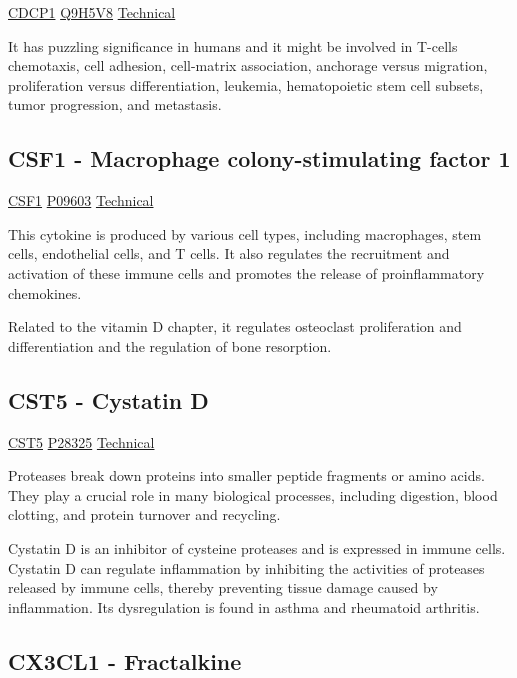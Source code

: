 \href{https://en.wikipedia.org/wiki/CDCP1}{CDCP1}
\href{http://www.uniprot.org/uniprot/Q9H5V8}{Q9H5V8}
\href{https://olink.com/products-services/target/protein/?assayID=5067}{Technical}

It has puzzling significance in humans and it might be involved in T-cells chemotaxis, cell adhesion, cell-matrix association, anchorage versus migration, proliferation versus differentiation, leukemia, hematopoietic stem cell subsets, tumor progression, and metastasis.


\subsection{CSF1 - Macrophage colony-stimulating factor 1}

\href{https://en.wikipedia.org/wiki/Macrophage\_colony-stimulating\_factor}{CSF1}
\href{http://www.uniprot.org/uniprot/P09603}{P09603}
\href{https://olink.com/products-services/target/protein/?assayID=5110}{Technical}

This cytokine is produced by various cell types, including macrophages, stem cells, endothelial cells, and T cells. It also regulates the recruitment and activation of these immune cells and promotes the release of proinflammatory chemokines.

Related to the vitamin D chapter, it regulates osteoclast proliferation and differentiation and the regulation of bone resorption.

\subsection{CST5 - Cystatin D}

\href{https://en.wikipedia.org/wiki/CST5}{CST5}
\href{http://www.uniprot.org/uniprot/P28325}{P28325}
\href{https://olink.com/products-services/target/protein/?assayID=5082}{Technical}

Proteases break down proteins into smaller peptide fragments or amino acids. They play a crucial role in many biological processes, including digestion, blood clotting, and protein turnover and recycling.

Cystatin D is an inhibitor of cysteine proteases and is expressed in immune cells. Cystatin D can regulate inflammation by inhibiting the activities of proteases released by immune cells, thereby preventing tissue damage caused by inflammation. Its dysregulation is found in asthma and rheumatoid arthritis.

\subsection{CX3CL1 - Fractalkine}

